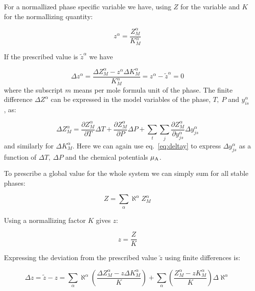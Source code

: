 \documentclass[12pt]{article}
\begin{document}
For a normallized phase specific variable we have, using $Z$ for the
variable and $K$ for the normallizing quantity:

\begin{equation}
z^{\alpha} = \frac{Z^{\alpha}_M}{K_M^{\alpha}}
\end{equation}

If the prescribed value is $\widetilde z^{\alpha}$ we have

\begin{equation}
\Delta z^{\alpha} = 
\frac{\Delta Z^{\alpha}_M - z^{\alpha} \Delta K^{\alpha}_M}{K^{\alpha}_M}
= z^{\alpha} - \tilde z^{\alpha} = 0
\end{equation}
where the subscript $m$ means per mole formula unit of the phase.  The
finite difference $\Delta Z^{\alpha}$ can be expressed in the model
variables of the phase, $T, ~P$ and $y^{\alpha}_{is}$, as:

\begin{equation}
\Delta Z^{\alpha}_M = \frac{\partial Z^{\alpha}_M}{\partial T} \Delta T +
\frac{\partial Z^{\alpha}_M}{\partial P} \Delta P +
\sum_t \sum_j \frac{\partial Z^{\alpha}_M}{\partial y_{js}^{\alpha}}
\Delta y_{js}^{\alpha}\label{eq:deltaz}
\end{equation}
and similarly for $\Delta K_M^{\alpha}$.  Here we can again use
eq.~\ref{eq:deltay} to express $\Delta y_{js}^{\alpha}$ as a function
of $\Delta T, ~\Delta P$ and the chemical potentials $\mu_{\rm A}$.

To prescribe a global value for the whole system we can simply sum for
all stable phases:

\begin{equation}
Z = \sum_{\alpha} \aleph^{\alpha} Z^{\alpha}_M
\end{equation}

Using a normallizing factor $K$ gives $z$:

\begin{equation}
z = \frac{Z}{K}
\end{equation}

Expressing the deviation from the prescribed value $\widetilde z$
using finite differences is:

\begin{equation}
\Delta z = \tilde z - z = \sum_{\alpha} \aleph^{\alpha} \left(
\frac{\Delta Z^{\alpha}_M - z \Delta K^{\alpha}_M}{K}\right)
+\sum_{\alpha}\left(\frac{Z^{\alpha}_M - zK^{\alpha}_M}{K}\right)
\Delta \aleph^{\alpha} \label{eq:deltaoz}
\end{equation}
\end{document}
